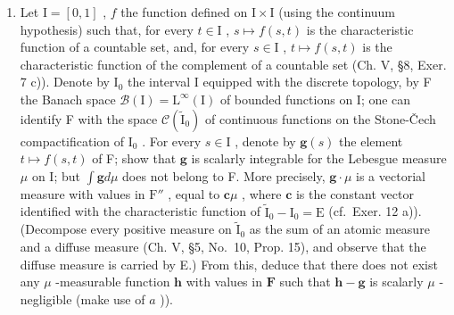 \begin{enumerate}
\def\labelenumi{\alph{enumi})}
\setcounter{enumi}{1}
\tightlist
\item
  Let \(\mathrm{I} = [0,1]\) , \(f\) the function defined on \(\mathrm{I} \times \mathrm{I}\) (using the continuum hypothesis) such that, for every \(t \in \mathrm{I}\) , \(s \mapsto f(s,t)\) is the characteristic function of a countable set, and, for every \(s \in \mathrm{I}\) , \(t \mapsto f(s,t)\) is the characteristic function of the complement of a countable set (Ch. V, §8, Exer. 7 c)). Denote by \(\mathrm{I}_0\) the interval I equipped with the discrete topology, by F the Banach space \(\mathcal{B}(\mathrm{I}) = \mathrm{L}^\infty(\mathrm{I})\) of bounded functions on I; one can identify F with the space \(\mathcal{C}(\widetilde{\mathrm{I}}_0)\) of continuous functions on the Stone-Čech compactification of \(\mathrm{I}_0\) . For every \(s \in \mathrm{I}\) , denote by \(\mathbf{g}(s)\) the element \(t \mapsto f(s,t)\) of F; show that \(\mathbf{g}\) is scalarly integrable for the Lebesgue measure \(\mu\) on I; but \(\int \mathbf{g} d\mu\) does not belong to F. More precisely, \(\mathbf{g} \cdot \mu\) is a vectorial measure with values in \(\mathrm{F}''\) , equal to \(\mathbf{c}\mu\) , where \(\mathbf{c}\) is the constant vector identified with the characteristic function of \(\widetilde{\mathrm{I}}_0 - \mathrm{I}_0 = \mathrm{E}\) (cf.~Exer. 12 a)). (Decompose every positive measure on \(\widetilde{\mathrm{I}}_0\) as the sum of an atomic measure and a diffuse measure (Ch. V, §5, No.~10, Prop. 15), and observe that the diffuse measure is carried by E.) From this, deduce that there does not exist any \(\mu\) -measurable function \(\mathbf{h}\) with values in \(\mathbf{F}\) such that \(\mathbf{h} - \mathbf{g}\) is scalarly \(\mu\) -negligible (make use of \(a\) )).
\end{enumerate}

